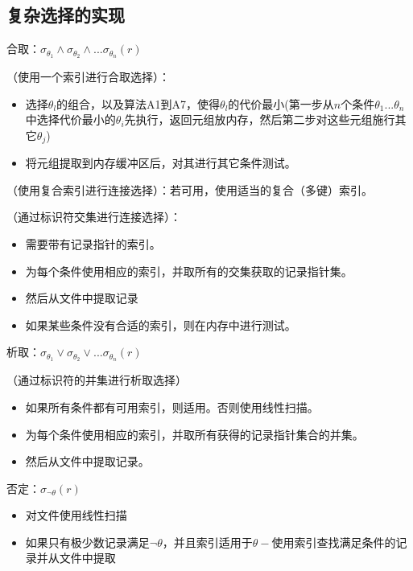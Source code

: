 \subsection{复杂选择的实现}

合取：$\sigma_{\theta_1}\land \sigma_{\theta_2}\land ...\sigma_{\theta_n}(r)$

（使用一个索引进行合取选择）：
\begin{itemize}
    \item 选择$\theta_l$的组合，以及算法A1到A7，使得$\theta_l$的代价最小(第一步从$n$个条件$\theta_1...\theta_n$中选择代价最小的$\theta_i$先执行，返回元组放内存，然后第二步对这些元组施行其它$\theta_j$)
    \item 将元组提取到内存缓冲区后，对其进行其它条件测试。
\end{itemize}

（使用复合索引进行连接选择）：若可用，使用适当的复合（多键）索引。

（通过标识符交集进行连接选择）：
\begin{itemize}
    \item 需要带有记录指针的索引。
    \item 为每个条件使用相应的索引，并取所有的交集获取的记录指针集。
    \item 然后从文件中提取记录
    \item 如果某些条件没有合适的索引，则在内存中进行测试。
\end{itemize}

析取：$\sigma_{\theta_1}\lor \sigma_{\theta_2}\lor...\sigma_{\theta_n}(r)$

（通过标识符的并集进行析取选择）
\begin{itemize}
    \item 如果所有条件都有可用索引，则适用。否则使用线性扫描。
    \item 为每个条件使用相应的索引，并取所有获得的记录指针集合的并集。
    \item 然后从文件中提取记录。
\end{itemize}

否定：$\sigma_{\lnot \theta}(r)$
\begin{itemize}
    \item 对文件使用线性扫描
    \item 如果只有极少数记录满足$\lnot \theta$，并且索引适用于$\theta-$使用索引查找满足条件的记录并从文件中提取
\end{itemize}